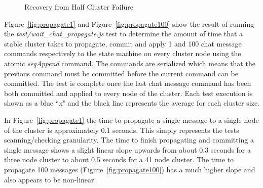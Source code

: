 \documentclass[conference,compsoc]{./IEEEtran/IEEEtran}
\begin{document}
\begin{figure}[!t]
    \caption{Recovery from Half Cluster Failure}
    \label{fig:recovery_half_failure}
\end{figure}



Figure~\ref{fig:propagate1} and Figure~\ref{fig:propagate100} show the
result of running the \emph{test/wait\_chat\_propagate.js} test to
determine the amount of time that a stable cluster takes to propagate,
commit and apply 1 and 100 chat message commands respectively to the state
machine on every cluster node using the atomic \emph{seqAppend}
command. The commands are serialized which means that the previous
command must be committed before the current command can be committed.
The test is complete once the last chat message command has been both
committed and applied to every node of the cluster. Each test execution
is shown as a blue ``x" and the black line represents the average for
each cluster size.

In Figure~\ref{fig:propagate1} the time to propagate a single message
to a single node of the cluster is approximately 0.1 seconds. This
simply represents the tests scanning/checking granularity.  The time
to finish propagating and committing a single message shows a slight
linear slope upwards from about 0.3 seconds for a three node cluster
to about 0.5 seconds for a 41 node cluster. The time to propagate 100
messages (Figure~\ref{fig:propagate100}) has a much higher slope and
also appears to be non-linear. %
\end{document}

